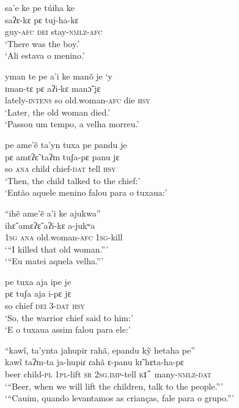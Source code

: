 \documentclass[output=paper,
modfonts,nonflat
]{langsci/langscibook}
\begin{document}
\ea sa'e ke pe túiha ke \\[.3em]
\gll saʔɛ-kɛ pɛ tuj-ha-kɛ \\
guy-\textsc{afc} \textsc{dei} stay-\textsc{nmlz-afc} \\
\glt ‘There was the boy.’ \\
‘Ali estava o menino.’ \\
\z

\newpage 
\ea yman te pe a'i ke manõ je ‘y \\[.3em]
\gll ɪman-tɛ pɛ aʔi-kɛ manɔ̃ jɛ \\
lately-\textsc{intens} so old.woman-\textsc{afc} die \textsc{hsy} \\
\glt ‘Later, the old woman died.’ \\
‘Passou um tempo, a velha morreu.’ \\
\z

\ea pe ame'ẽ ta'yn tuxa pe pandu je \\[.3em]
\gll pɛ amɛʔɛ̃ taʔɪn tuʃa-pɛ panu jɛ \\
so \textsc{ana} child chief-\textsc{dat} tell \textsc{hsy} \\
\glt ‘Then, the child talked to the chief:’ \\
‘Então aquele menino falou para o tuxaua:’ \\
\z

\ea “ihẽ ame'ẽ a'i ke ajukwa” \\[.3em]
\gll ihɛ̃ amɛʔɛ̃ aʔi-kɛ a-jukʷa \\
\textsc{1sg} \textsc{ana} old.woman-\textsc{afc} \textsc{1sg}-kill \\
\glt ‘“I killed that old woman.”’ \\
‘“Eu matei aquela velha.”’ \\
\z

\ea pe tuxa aja ipe je \\[.3em]
\gll pɛ tuʃa aja i-pɛ jɛ \\
so chief \textsc{dei} 3-\textsc{dat} \textsc{hsy} \\
\glt ‘So, the warrior chief said to him:’ \\
‘E o tuxaua assim falou para ele:’ \\
\z

\ea “kawĩ, ta'ynta jahupir rahã, epandu kỹ hetaha pe” \\[.3em]
\gll kawĩ taʔɪn-ta ja-hupiɾ ɾahã ɛ-panu kɪ̃ hɛta-ha-pɛ \\
beer child-\textsc{pl} \textsc{1pl}-lift \textsc{sr} \textsc{2sg.imp}-tell \textsc{kɪ̃} many-\textsc{nmlz}-\textsc{dat} \\
\glt ‘“Beer, when we will lift the children, talk to the people.”’ \\
‘“Cauim, quando levantamos as crianças, fale para o grupo.”’ \\
\z
\end{document}
